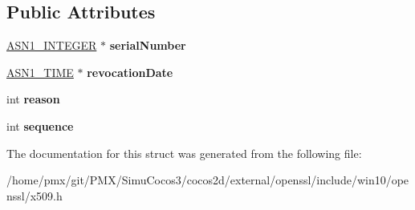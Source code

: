 \subsection*{Public Attributes}
\begin{DoxyCompactItemize}
\item 
\mbox{\label{structx509__revoked__st_a3b638a3caba10ce8daf6992fdd13658c}} 
\hyperlink{structasn1__string__st}{A\+S\+N1\+\_\+\+I\+N\+T\+E\+G\+ER} $\ast$ {\bfseries serial\+Number}
\item 
\mbox{\label{structx509__revoked__st_a9a86c7c9efcdf5a3289123ea82da8268}} 
\hyperlink{structasn1__string__st}{A\+S\+N1\+\_\+\+T\+I\+ME} $\ast$ {\bfseries revocation\+Date}
\item 
\mbox{\label{structx509__revoked__st_afc9d299c76450dd5f2937000b97795b2}} 
int {\bfseries reason}
\item 
\mbox{\label{structx509__revoked__st_a361a3358c3a578178e6482fc9a28ea86}} 
int {\bfseries sequence}
\end{DoxyCompactItemize}


The documentation for this struct was generated from the following file\+:\begin{DoxyCompactItemize}
\item 
/home/pmx/git/\+P\+M\+X/\+Simu\+Cocos3/cocos2d/external/openssl/include/win10/openssl/x509.\+h\end{DoxyCompactItemize}
